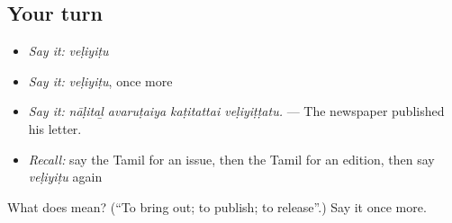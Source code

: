 \subsection*{Your turn}
\begin{itemize}
\raggedright
  \item \emph{Say it:} \emph{veḷiyiṭu}
  \item \emph{Say it:} \emph{veḷiyiṭu}, once more
  \item \emph{Say it:} \emph{nāḷitaḻ avaruṭaiya kaṭitattai veḷiyiṭṭatu.} — The newspaper published his letter.
  \item \emph{Recall:} say the Tamil for an issue, then the Tamil for an edition, then say \emph{veḷiyiṭu} again
\end{itemize}

\begin{tcolorbox}[breakable,colback=teal!4,colframe=teal!35!black,title={Before you move on}]
What does  mean? (\textquotedblleft{}To bring out; to publish; to release\textquotedblright{}.) Say it once more.
\end{tcolorbox}
